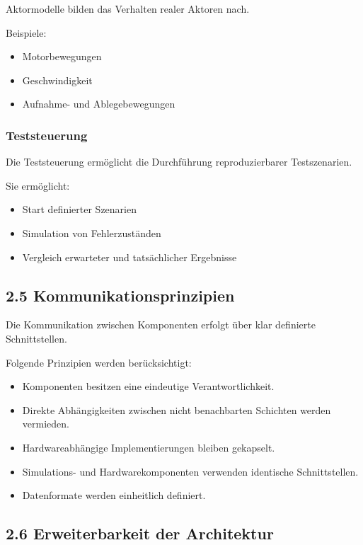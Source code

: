 \documentclass[
  a4paper,
  12pt,
  DIV=12,        %
  parskip=half,  %
  headings=small %
]{scrartcl}
\theoremstyle{definition}
\providecommand{\tightlist}{%
  \setlength{\itemsep}{0pt}\setlength{\parskip}{0pt}}
\theoremstyle{definition}
\providecommand{\tightlist}{%
  \setlength{\itemsep}{0pt}\setlength{\parskip}{0pt}}
\begin{document}
Aktormodelle bilden das Verhalten realer Aktoren nach.

Beispiele:

\begin{itemize}
\tightlist
\item
  Motorbewegungen
\item
  Geschwindigkeit
\item
  Aufnahme- und Ablegebewegungen
\end{itemize}

\subsubsection{Teststeuerung}\label{teststeuerung}

Die Teststeuerung ermöglicht die Durchführung reproduzierbarer
Testszenarien.

Sie ermöglicht:

\begin{itemize}
\tightlist
\item
  Start definierter Szenarien
\item
  Simulation von Fehlerzuständen
\item
  Vergleich erwarteter und tatsächlicher Ergebnisse
\end{itemize}

\subsection{2.5
Kommunikationsprinzipien}\label{kommunikationsprinzipien}

Die Kommunikation zwischen Komponenten erfolgt über klar definierte
Schnittstellen.

Folgende Prinzipien werden berücksichtigt:

\begin{itemize}
\tightlist
\item
  Komponenten besitzen eine eindeutige Verantwortlichkeit.
\item
  Direkte Abhängigkeiten zwischen nicht benachbarten Schichten werden
  vermieden.
\item
  Hardwareabhängige Implementierungen bleiben gekapselt.
\item
  Simulations- und Hardwarekomponenten verwenden identische
  Schnittstellen.
\item
  Datenformate werden einheitlich definiert.
\end{itemize}

\subsection{2.6 Erweiterbarkeit der
Architektur}\label{erweiterbarkeit-der-architektur}
\end{document}
